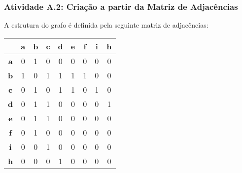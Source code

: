 \documentclass[a4paper,12pt]{article}
\begin{document}
\subsubsection*{Atividade A.2: Criação a partir da Matriz de Adjacências}
A estrutura do grafo é definida pela seguinte matriz de adjacências:
\begin{center}
\scriptsize
\begin{tabular*}{\textwidth}{c|@{\extracolsep{\fill}}cccccccc}
\rowcolor[gray]{0.9}
 & \textbf{a} & \textbf{b} & \textbf{c} & \textbf{d} & \textbf{e} & \textbf{f} & \textbf{i} & \textbf{h} \\
\hline
\textbf{a} & 0 & 1 & 0 & 0 & 0 & 0 & 0 & 0 \\
\textbf{b} & 1 & 0 & 1 & 1 & 1 & 1 & 0 & 0 \\
\textbf{c} & 0 & 1 & 0 & 1 & 1 & 0 & 1 & 0 \\
\textbf{d} & 0 & 1 & 1 & 0 & 0 & 0 & 0 & 1 \\
\textbf{e} & 0 & 1 & 1 & 0 & 0 & 0 & 0 & 0 \\
\textbf{f} & 0 & 1 & 0 & 0 & 0 & 0 & 0 & 0 \\
\textbf{i} & 0 & 0 & 1 & 0 & 0 & 0 & 0 & 0 \\
\textbf{h} & 0 & 0 & 0 & 1 & 0 & 0 & 0 & 0 \\
\end{tabular*}
\end{center}
\end{document}
